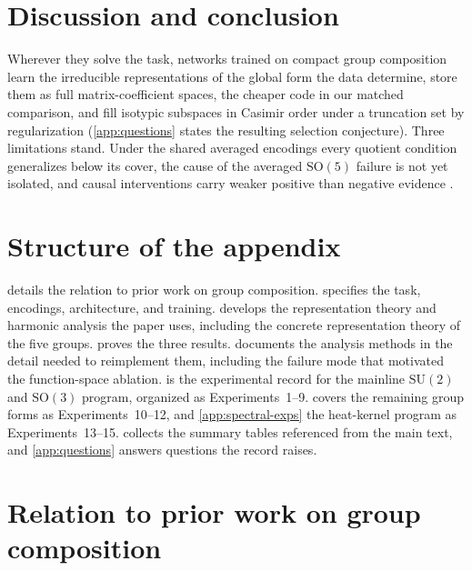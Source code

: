 \documentclass{article}
\newcommand{\SU}{\mathrm{SU}}
\newcommand{\SO}{\mathrm{SO}}
\begin{document}
\section{Discussion and conclusion}
\label{sec:discussion}

Wherever they solve the task, networks trained on compact group
composition learn the irreducible representations of the global form the
data determine, store them as full matrix-coefficient spaces,
the cheaper code in our matched comparison, and fill isotypic subspaces
in Casimir order under a truncation set by regularization (\cref{app:questions} states the resulting selection conjecture). Three
limitations stand. Under the shared averaged encodings every quotient
condition generalizes below its cover, the cause of the averaged
$\SO(5)$ failure is not yet isolated, and causal interventions carry
weaker positive than negative evidence \cite{wu2024}.




\appendix

\section{Structure of the appendix}
\label{app:structure}

 details the relation to prior work on group
composition.  specifies the task, encodings,
architecture, and training.  develops the
representation theory and harmonic analysis the paper uses, including
the concrete representation theory of the five groups.
 proves the three results. 
documents the analysis methods in the detail needed to reimplement
them, including the failure mode that motivated the function-space
ablation.  is the experimental record for the
mainline $\SU(2)$ and $\SO(3)$ program, organized as
Experiments~1--9.  covers the remaining
group forms as Experiments~10--12, and \cref{app:spectral-exps} the
heat-kernel program as Experiments~13--15.  collects
the summary tables referenced from the main text, and
\cref{app:questions} answers questions the record raises.

\section{Relation to prior work on group composition}
\label{app:priorwork}
\end{document}
